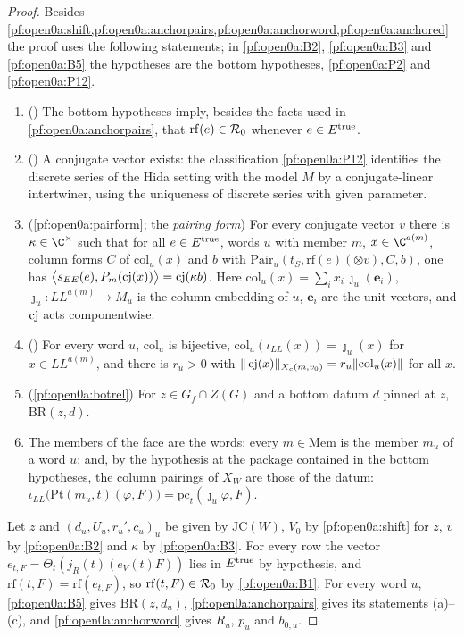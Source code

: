 \begin{proof}
Besides \cref{pf:open0a:shift,pf:open0a:anchorpairs,pf:open0a:anchorword,pf:open0a:anchored} the proof uses the
following statements; in \ref{pf:open0a:B2}, \ref{pf:open0a:B3} and \ref{pf:open0a:B5} the hypotheses are the bottom
hypotheses, \ref{pf:open0a:P2} and \ref{pf:open0a:P12}.
\begin{enumerate}[label=(B\arabic*),leftmargin=*]
\item\label{pf:open0a:B1} () The bottom hypotheses imply, besides the
facts used in \cref{pf:open0a:anchorpairs}, that $\mathrm{rf}(e)\in\mathcal{R}_0$ whenever $e\in E^{\mathrm{true}}$.
\item\label{pf:open0a:B2} () A conjugate vector exists: the
classification \ref{pf:open0a:P12} identifies the discrete series of the Hida setting with the model $M$ by a
conjugate-linear intertwiner, using the uniqueness of discrete series with given parameter.
\item\label{pf:open0a:B3} (\cref{pf:open0a:pairform}; the \emph{pairing form}) For every
conjugate vector $v$ there is $\kappa\in\C^\times$ such that for all $e\in E^{\mathrm{true}}$, words $u$ with member $m$,
$x\in\C^{a(m)}$, column forms $C$ of $\mathrm{col}_u(x)$ and $b$ with $\mathrm{Pair}_u(t_S,\mathrm{rf}(e)(\otimes v),C,b)$,
one has $\bigl\langle s_{EE}(e),P_m(\operatorname{cj}(x))\bigr\rangle=\operatorname{cj}(\kappa b)$. Here
$\mathrm{col}_u(x)=\sum_ix_i\,\jmath_u(\mathbf e_i)$, $\jmath_u\colon\mathit{LL}^{a(m)}\to M_u$ is the column embedding
of $u$, $\mathbf e_i$ are the unit vectors, and $\operatorname{cj}$ acts componentwise.
\item\label{pf:open0a:B4} () For every word $u$, $\mathrm{col}_u$ is
bijective, $\mathrm{col}_u(\iota_{\mathit{LL}}(x))=\jmath_u(x)$ for $x\in\mathit{LL}^{a(m)}$, and there is $r_u>0$ with
$\|\operatorname{cj}(x)\|_{X_c(m,v_0)}=r_u\|\mathrm{col}_u(x)\|$ for all $x$.
\item\label{pf:open0a:B5} (\cref{pf:open0a:botrel}) For $z\in G_f\cap Z(G)$ and a bottom datum $d$ pinned at $z$,
$\mathrm{BR}(z,d)$.
\item\label{pf:open0a:B6} The members of the face are the words: every $m\in\mathrm{Mem}$ is the member $m_u$ of a word
$u$; and, by the hypothesis at the package contained in the bottom hypotheses, the column pairings of $X_W$ are those
of the datum: $\iota_{\mathit{LL}}\bigl(\mathrm{Pt}(m_u,t)(\varphi,F)\bigr)=\mathrm{pc}_t(\jmath_u\varphi,F)$.
\end{enumerate}
Let $z$ and $(d_u,U_u,r_u',c_u)_u$ be given by $\mathrm{JC}(W)$, $V_0$ by \cref{pf:open0a:shift} for $z$, $v$ by
\ref{pf:open0a:B2} and $\kappa$ by \ref{pf:open0a:B3}. For every row the vector $e_{t,F}=\Theta_t(j_R(t)(e_V(t)F))$
lies in $E^{\mathrm{true}}$ by hypothesis, and $\mathrm{rf}(t,F)=\mathrm{rf}(e_{t,F})$, so $\mathrm{rf}(t,F)\in\mathcal{R}_0$
by \ref{pf:open0a:B1}. For every word $u$, \ref{pf:open0a:B5} gives $\mathrm{BR}(z,d_u)$, \cref{pf:open0a:anchorpairs}
gives its statements (a)--(c), and \cref{pf:open0a:anchorword} gives $R_u$, $p_u$ and $b_{0,u}$.


\end{proof}

